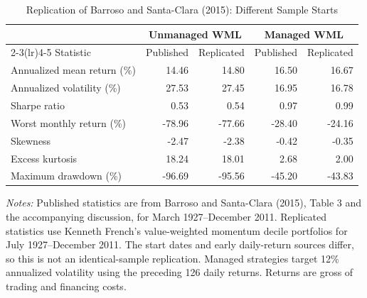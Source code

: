 
\begin{table}[htbp]
\centering
\caption{Replication of Barroso and Santa-Clara (2015): Different Sample Starts}
\label{tab:replication}
\small
\begin{tabular}{lrrrr}
\toprule
& \multicolumn{2}{c}{Unmanaged WML}
& \multicolumn{2}{c}{Managed WML} \\
\cmidrule(lr){2-3}\cmidrule(lr){4-5}
Statistic & Published & Replicated & Published & Replicated \\
\midrule
Annualized mean return (\%) & 14.46 & 14.80 & 16.50 & 16.67 \\
Annualized volatility (\%) & 27.53 & 27.45 & 16.95 & 16.78 \\
Sharpe ratio & 0.53 & 0.54 & 0.97 & 0.99 \\
Worst monthly return (\%) & -78.96 & -77.66 & -28.40 & -24.16 \\
Skewness & -2.47 & -2.38 & -0.42 & -0.35 \\
Excess kurtosis & 18.24 & 18.01 & 2.68 & 2.00 \\
Maximum drawdown (\%) & -96.69 & -95.56 & -45.20 & -43.83 \\
\bottomrule
\end{tabular}

\vspace{0.5em}
\begin{minipage}{0.98\textwidth}
\footnotesize
\textit{Notes:} Published statistics are from Barroso and
Santa-Clara (2015), Table 3 and the accompanying discussion,
for March 1927--December 2011. Replicated statistics use
Kenneth French's value-weighted momentum decile portfolios
for July 1927--December 2011. The start dates and early daily-return
sources differ, so this is not an identical-sample replication.
Managed strategies target
12\% annualized volatility using the preceding 126 daily
returns. Returns are gross of trading and financing costs.
\end{minipage}
\end{table}
